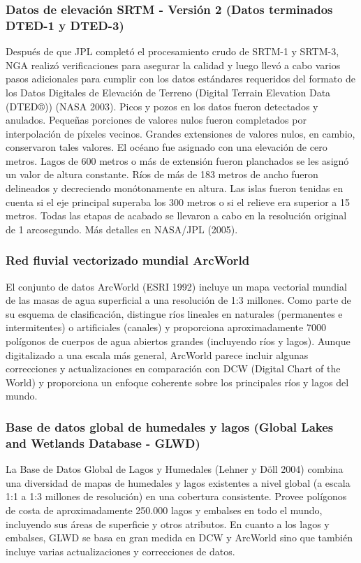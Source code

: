 \documentclass[10pt,a4paper, twoside]{report}
\begin{document}
\subsubsection{Datos de elevación SRTM - Versión 2 (Datos terminados DTED-1 y DTED-3)}
\label{SRTMDefincion}


Después de que JPL completó el procesamiento crudo de SRTM-1 y SRTM-3, NGA realizó verificaciones para asegurar la calidad y luego llevó a cabo varios pasos adicionales para cumplir con los datos estándares requeridos del formato de los Datos Digitales de Elevación de Terreno (Digital Terrain Elevation Data (DTED®)) (NASA 2003). Picos y pozos en los datos fueron detectados y anulados. Pequeñas porciones de valores nulos fueron completados por interpolación de píxeles vecinos. Grandes extensiones de valores nulos, en cambio, conservaron tales valores. El océano fue asignado con una elevación de cero metros. Lagos de 600 metros o más de extensión fueron planchados se les asignó un valor de altura constante. Ríos de más de 183 metros de ancho fueron delineados y decreciendo monótonamente en altura. Las islas fueron tenidas en cuenta si el eje principal superaba los 300 metros o si el relieve era superior a 15 metros. Todas las etapas de acabado se llevaron a cabo en la resolución original de 1 arcosegundo. Más detalles en NASA/JPL (2005).

\subsubsection{Red fluvial vectorizado mundial ArcWorld}
\label{ArcWorldLabel}

El conjunto de datos ArcWorld (ESRI 1992) incluye un mapa vectorial mundial de las masas de agua superficial a una resolución de 1:3 millones. Como parte de su esquema de clasificación, distingue ríos lineales en naturales (permanentes e intermitentes) o artificiales (canales) y proporciona aproximadamente 7000 polígonos de cuerpos de agua abiertos grandes (incluyendo ríos y lagos). Aunque digitalizado a una escala más general, ArcWorld parece incluir algunas correcciones y actualizaciones en comparación con DCW (Digital Chart of the World) y proporciona un enfoque coherente sobre los principales ríos y lagos del mundo.

\subsubsection{Base de datos global de humedales y lagos (Global Lakes and Wetlands Database - GLWD)}
\label{GLWDLabel}
La Base de Datos Global de Lagos y Humedales (Lehner y Döll 2004) combina una diversidad de mapas de humedales y lagos existentes a nivel global (a escala 1:1 a 1:3 millones de resolución) en una cobertura consistente. Provee polígonos de costa de aproximadamente 250.000 lagos y embalses en todo el mundo, incluyendo sus áreas de superficie y otros atributos. En cuanto a los lagos y embalses, GLWD se basa en gran medida en DCW y ArcWorld sino que también incluye varias actualizaciones y correcciones de datos.
\end{document}
